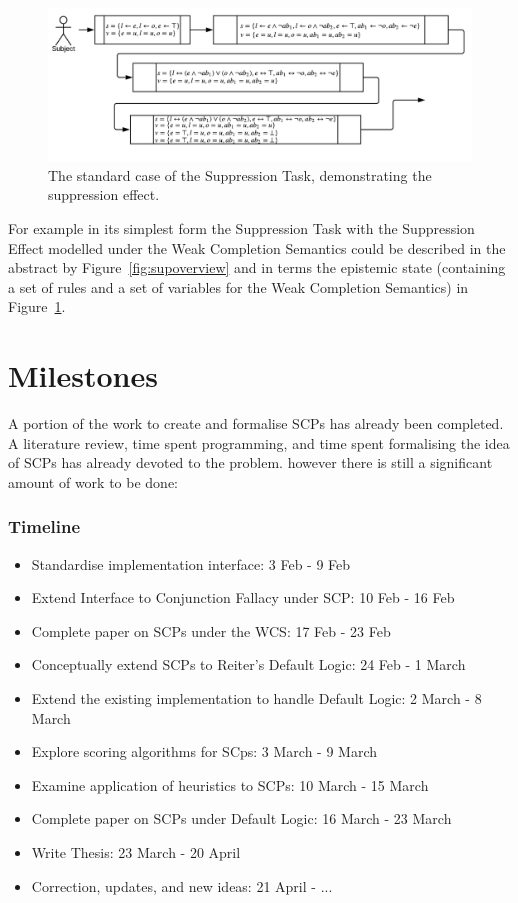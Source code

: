 \documentclass{article}
\begin{document}
\begin{figure}
\begin{center}
 \centering \includegraphics[scale=0.75]{suppressionSCP_normal}
\caption{The standard case of the Suppression Task, demonstrating the suppression effect. }
\label {fig:supnormal}
\end{center}
\end{figure}

For example in its simplest form the Suppression Task with the Suppression Effect modelled under the Weak Completion Semantics could be described in the abstract by Figure~\ref{fig:supoverview} and in terms the epistemic state (containing a set of rules and a set of variables for the Weak Completion Semantics) in Figure~\ref{fig:supnormal}.

\section{Milestones}
A portion of the work to create and formalise SCPs has already been completed. A literature review, time spent programming, and time spent formalising the idea of SCPs has already devoted to the problem. however there is still a significant amount of work to be done:

\subsubsection*{Timeline}
\begin{itemize}
\item Standardise implementation interface: 3 Feb - 9 Feb
\item Extend Interface to Conjunction Fallacy under SCP: 10 Feb - 16 Feb
\item Complete paper on SCPs under the WCS: 17 Feb - 23 Feb
\item Conceptually extend SCPs to Reiter's Default Logic: 24 Feb - 1 March
\item Extend the existing implementation to handle Default Logic: 2 March - 8 March
\item Explore scoring algorithms for SCps: 3 March - 9 March
\item Examine application of heuristics to SCPs: 10 March - 15 March
\item Complete paper on SCPs under Default Logic: 16 March - 23 March
\item Write Thesis: 23 March - 20 April
\item Correction, updates, and new ideas: 21 April - ...
\end{itemize}
\end{document}
